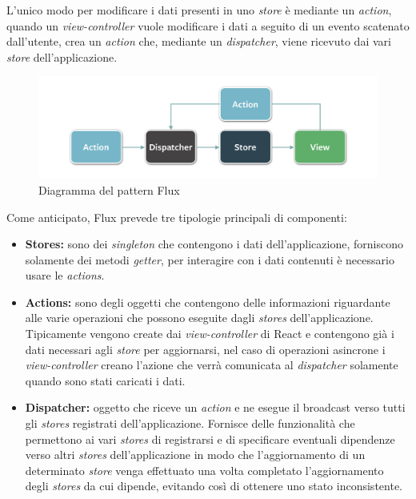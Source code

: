 L'unico modo per modificare i dati presenti in uno \textit{store} è mediante un \textit{action}, quando un \textit{view-controller} vuole modificare i dati a seguito di un evento scatenato dall'utente, crea un \textit{action} che, mediante un \textit{dispatcher}, viene ricevuto dai vari \textit{store} dell'applicazione.

\begin{figure}[htp]
\centering
\includegraphics[width=\textwidth*3/4]{../immagini/flux-simple}
\caption{Diagramma del pattern Flux}  
\end{figure}
\FloatBarrier

Come anticipato, Flux prevede tre tipologie principali di componenti:
\begin{itemize}
\item \textbf{Stores:} sono dei \textit{singleton} che contengono i dati dell'applicazione, forniscono solamente dei metodi \textit{getter}, per interagire con i dati contenuti è necessario usare le \textit{actions}.
\item \textbf{Actions:} sono degli oggetti che contengono delle informazioni riguardante alle varie operazioni che possono eseguite dagli \textit{stores} dell'applicazione. Tipicamente vengono create dai \textit{view-controller} di React e contengono già i dati necessari agli \textit{store} per aggiornarsi, nel caso di operazioni asincrone i \textit{view-controller} creano l'azione che verrà comunicata al \textit{dispatcher} solamente quando sono stati caricati i dati.
\item \textbf{Dispatcher:} oggetto che riceve un \textit{action} e ne esegue il broadcast verso tutti gli \textit{stores} registrati dell'applicazione. Fornisce delle funzionalità che permettono ai vari \textit{stores} di registrarsi e di specificare eventuali dipendenze verso altri \textit{stores} dell'applicazione in modo che l'aggiornamento di un determinato \textit{store} venga effettuato una volta completato l'aggiornamento degli \textit{stores} da cui dipende, evitando così di ottenere uno stato inconsistente.
\end{itemize}


